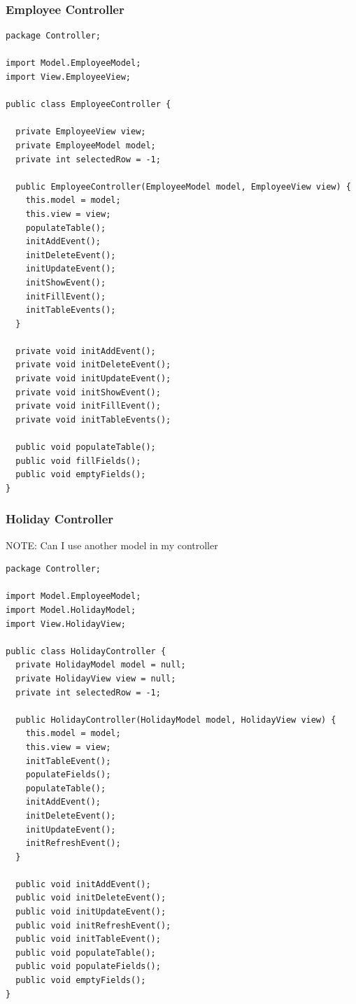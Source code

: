 \documentclass[12pt]{article}
\begin{document}
\subsubsection{Employee Controller}
\begin{lstlisting}
package Controller;

import Model.EmployeeModel;
import View.EmployeeView;

public class EmployeeController {

  private EmployeeView view;
  private EmployeeModel model;
  private int selectedRow = -1;

  public EmployeeController(EmployeeModel model, EmployeeView view) {
    this.model = model;
    this.view = view;
    populateTable();
    initAddEvent();
    initDeleteEvent();
    initUpdateEvent();
    initShowEvent();
    initFillEvent();
    initTableEvents();
  }

  private void initAddEvent();
  private void initDeleteEvent();
  private void initUpdateEvent();
  private void initShowEvent();
  private void initFillEvent();
  private void initTableEvents();

  public void populateTable();
  public void fillFields();
  public void emptyFields();
}
\end{lstlisting}

\pagebreak

\subsubsection{Holiday Controller}
NOTE: Can I use another model in my controller
\begin{lstlisting}
package Controller;

import Model.EmployeeModel;
import Model.HolidayModel;
import View.HolidayView;

public class HolidayController {
  private HolidayModel model = null;
  private HolidayView view = null;
  private int selectedRow = -1;

  public HolidayController(HolidayModel model, HolidayView view) {
    this.model = model;
    this.view = view;
    initTableEvent();
    populateFields();
    populateTable();
    initAddEvent();
    initDeleteEvent();
    initUpdateEvent();
    initRefreshEvent();
  }

  public void initAddEvent();
  public void initDeleteEvent();
  public void initUpdateEvent();
  public void initRefreshEvent();
  public void initTableEvent();
  public void populateTable();
  public void populateFields();
  public void emptyFields();
}
\end{lstlisting}
\end{document}
